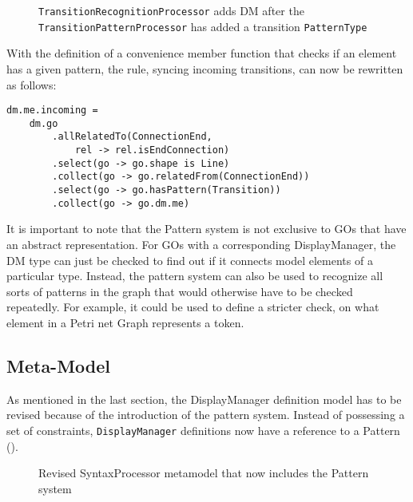 \begin{figure}[ht]
  \centering
  
  \caption{\texttt{TransitionRecognitionProcessor} adds DM after the \texttt{TransitionPatternProcessor} has added a transition \texttt{PatternType}}
  \label{fig:Transition-Kind-Recognition}
\end{figure}

With the definition of a convenience member function that checks if an element has a given pattern, the rule, syncing incoming transitions, can now be rewritten as follows:
\begin{lstlisting}[captionpos=b,caption={Improved incoming transition rule, which also filters for elements that match the \texttt{Transition} pattern.}]
dm.me.incoming = 
    dm.go
        .allRelatedTo(ConnectionEnd,
            rel -> rel.isEndConnection)
        .select(go -> go.shape is Line)
        .collect(go -> go.relatedFrom(ConnectionEnd))
        .select(go -> go.hasPattern(Transition))
        .collect(go -> go.dm.me)
\end{lstlisting}


It is important to note that the Pattern system is not exclusive to GOs that have an abstract representation. For GOs with a corresponding DisplayManager, the DM type can just be checked to find out if it connects model elements of a particular type. Instead, the pattern system can also be used to recognize all sorts of patterns in the graph that would otherwise have to be checked repeatedly. For example, it could be used to define a stricter check, on what element in a Petri net Graph represents a token.

\subsection{Meta-Model}
As mentioned in the last section, the DisplayManager definition model has to be revised because of the introduction of the pattern system. Instead of possessing a set of constraints, \texttt{DisplayManager} definitions now have a reference to a Pattern ().

\begin{figure}
  \centering
  
  \caption{Revised SyntaxProcessor metamodel that now includes the Pattern system}
  \label{fig:revised-syntax-model}
\end{figure}



